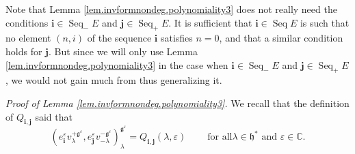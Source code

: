 \documentclass[etingof-lie.tex]{subfiles}
\begin{document}
Note that Lemma \ref{lem.invformnondeg.polynomiality3} does not really need
the conditions $\mathbf{i}\in\operatorname*{Seq}\nolimits_{-}E$ and
$\mathbf{j}\in\operatorname*{Seq}\nolimits_{+}E$. It is sufficient that
$\mathbf{i}\in\operatorname*{Seq}E$ is such that no element $\left(
n,i\right)  $ of the sequence $\mathbf{i}$ satisfies $n=0$, and that a similar
condition holds for $\mathbf{j}$. But since we will only use Lemma
\ref{lem.invformnondeg.polynomiality3} in the case when $\mathbf{i}%
\in\operatorname*{Seq}\nolimits_{-}E$ and $\mathbf{j}\in\operatorname*{Seq}%
\nolimits_{+}E$, we would not gain much from thus generalizing it.

\textit{Proof of Lemma \ref{lem.invformnondeg.polynomiality3}.} We recall that
the definition of $Q_{\mathbf{i},\mathbf{j}}$ said that%
\begin{equation}
\left(  e_{\mathbf{i}}^{\varepsilon}v_{\lambda}^{+\mathfrak{g}^{\varepsilon}%
},e_{\mathbf{j}}^{\varepsilon}v_{-\lambda}^{-\mathfrak{g}^{\varepsilon}%
}\right)  _{\lambda}^{\mathfrak{g}^{\varepsilon}}=Q_{\mathbf{i},\mathbf{j}%
}\left(  \lambda,\varepsilon\right)  \ \ \ \ \ \ \ \ \ \ \text{for all
}\lambda\in\mathfrak{h}^{\ast}\text{ and }\varepsilon\in\mathbb{C}.
\label{pf.invformnondeg.polynomiality3.1}%
\end{equation}
\end{document}
